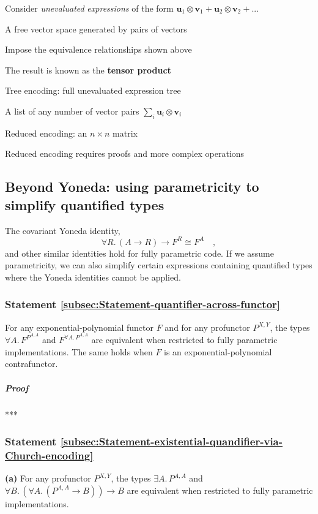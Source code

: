 Consider \emph{unevaluated} \emph{expressions} of the form $\mathbf{u}_{1}\otimes\mathbf{v}_{1}+\mathbf{u}_{2}\otimes\mathbf{v}_{2}+...$

A free vector space generated by pairs of vectors

Impose the equivalence relationships shown above

The result is known as the \textbf{tensor product}

Tree encoding: full unevaluated expression tree

A list of any number of vector pairs $\sum_{i}\mathbf{u}_{i}\otimes\mathbf{v}_{i}$

Reduced encoding: an $n\times n$ matrix

Reduced encoding requires proofs and more complex operations

\subsection{Beyond Yoneda: using parametricity to simplify quantified types}

The covariant Yoneda identity,
\[
\forall R.\,(A\rightarrow R)\rightarrow F^{R}\cong F^{A}\quad,
\]
and other similar identities hold for fully parametric code. If we
assume parametricity, we can also simplify certain expressions containing
quantified types where the Yoneda identities cannot be applied.

\subsubsection{Statement \label{subsec:Statement-quantifier-across-functor}\ref{subsec:Statement-quantifier-across-functor}}

For any exponential-polynomial functor $F$ and for any profunctor
$P^{X,Y}$, the types $\forall A.\,F^{P^{A,A}}$ and $F^{\forall A.\,P^{A,A}}$
are equivalent when restricted to fully parametric implementations.
The same holds when $F$ is an exponential-polynomial contrafunctor.

\subparagraph{Proof}

{*}{*}{*}

\subsubsection{Statement \label{subsec:Statement-existential-quandifier-via-Church-encoding}\ref{subsec:Statement-existential-quandifier-via-Church-encoding}}

\textbf{(a)} For any profunctor $P^{X,Y}$, the types $\exists A.\,P^{A,A}$
and $\forall B.\,(\forall A.\,(P^{A,A}\rightarrow B))\rightarrow B$
are equivalent when restricted to fully parametric implementations.

